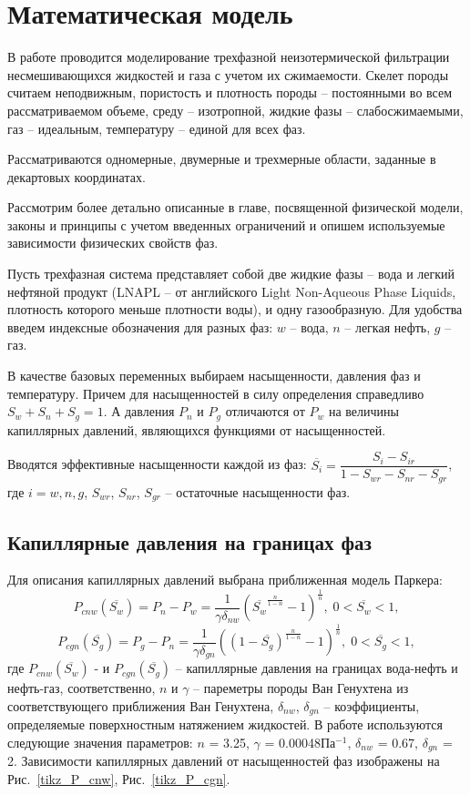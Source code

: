 %
\section{Математическая модель}
\label{math_section}
%
В работе проводится моделирование трехфазной неизотермической фильтрации 
несмешивающихся жидкостей и газа с учетом их сжимаемости. Скелет породы
считаем неподвижным, пористость и плотность породы -- постоянными во всем
рассматриваемом объеме, среду -- изотропной, жидкие фазы -- слабосжимаемыми,
газ -- идеальным, температуру -- единой для всех фаз.

Рассматриваются одномерные, двумерные и трехмерные
области, заданные в декартовых координатах.

Рассмотрим более детально описанные в главе, посвященной физической
модели, законы и принципы с учетом введенных ограничений и опишем
используемые зависимости физических свойств фаз.

Пусть трехфазная система представляет собой две жидкие фазы -- вода и легкий
нефтяной продукт (LNAPL -- от английского Light Non-Aqueous Phase Liquids,
плотность которого меньше плотности воды), и одну газообразную.
Для удобства введем индексные обозначения для разных фаз: $w$ -- вода, $n$ --
легкая нефть, $g$ -- газ.

В качестве базовых переменных выбираем насыщенности, давления фаз и температуру.
Причем для насыщенностей в силу определения справедливо  $S_w + S_n + S_g = 1$.
А давления $P_n$ и $P_g$ отличаются от $P_w$ на величины капиллярных
давлений, являющихся функциями от насыщенностей.

Вводятся эффективные насыщенности каждой из фаз:
$\overline{S_i}={\dfrac{S_i-S_{ir}}{1-S_{wr}-S_{nr}-S_{gr}}}$, где $i=w,n,g$, $S_{wr}$,
$S_{nr}$, $S_{gr}$ -- остаточные насыщенности фаз.

\subsection{Капиллярные давления на границах фаз}
Для описания
капиллярных давлений выбрана приближенная модель Паркера\cite{Parker}:
$$P_{cnw}(\overline{S_w})=P_n-P_w={\frac{1}{\gamma \delta_{nw}}}
\left( \overline{S_w}^{\frac{n}{1-n}}-1 \right)^\frac{1}{n},\;0<\overline{S_w}<1, $$
$$P_{cgn}(\overline{S_g})=P_g-P_n={\frac{1}{\gamma \delta_{gn}}}
\left( (1-\overline{S_g})^{\frac{n}{1-n}}-1 \right)^\frac{1}{n},\;0<\overline{S_g}<1,$$
где $P_{cnw}(\overline{S_w})$ - и $P_{cgn}(\overline{S_g})$ -- капиллярные давления на границах вода-нефть и нефть-газ, 
соответственно, $n$ и $\gamma $ -- пареметры породы Ван Генухтена из соответствующего приближения
Ван Генухтена\cite{Genuchten}, $\delta_{nw}$, $\delta_{gn}$ -- коэффициенты, определяемые поверхностным натяжением 
жидкостей. В работе используются следующие значения параметров: $n$ = 3.25, $\gamma $ = 0.00048Па$^{-1}$,
$\delta_{nw}$ = 0.67, $\delta_{gn}$ = 2. Зависимости капиллярных давлений от насыщенностей фаз
изображены на Рис.~\ref{tikz_P_cnw}, Рис.~\ref{tikz_P_cgn}.

